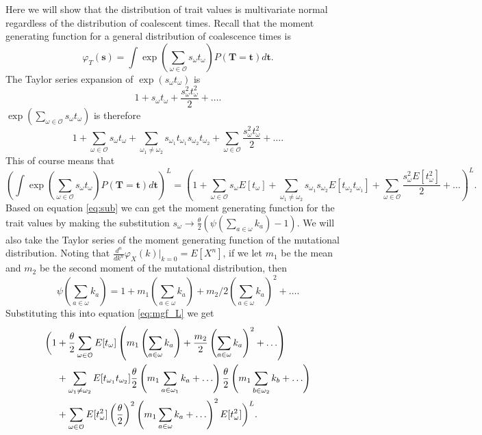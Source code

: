 Here we will show that the distribution of trait values is multivariate normal
regardless of the distribution of coalescent times. Recall that the moment
generating function for a general distribution of coalescence times is
\begin{equation}
  \varphi_T(\mathbf{s}) = \int \exp \left( \sum_{\omega \in \mathcal{O}} s_{\omega}t_{\omega} \right)
  P(\mathbf{T}=\mathbf{t})d\mathbf{t}.
\end{equation}
The Taylor series expansion of $\exp \left( s_{\omega}t_{\omega} \right)$ is
\begin{equation}
  1 + s_{\omega}t_{\omega} + \frac{s_{\omega}^2t_{\omega}^2}{2} + \ldots. \nonumber
\end{equation}
$\exp \left( \sum_{\omega \in \mathcal{O}} s_{\omega}t_{\omega} \right)$ is therefore
\begin{equation}
  1 + \sum_{\omega \in \mathcal{O}} s_{\omega}t_{\omega} +
  \sum_{\omega_1 \neq \omega_2} s_{\omega_1}t_{\omega_1}s_{\omega_2}t_{\omega_2} + 
  \sum_{\omega \in \mathcal{O}} \frac{s_{\omega}^2t_{\omega}^2}{2} + \ldots. \nonumber
\end{equation}
This of course means that
\begin{equation}
  \label{eq:mgf_L}
  \left(\int \exp \left( \sum_{\omega \in \mathcal{O}} s_{\omega}t_{\omega}
  \right)P(\mathbf{T}=\mathbf{t})d\mathbf{t}\right)^L = \left(1 + \sum_{\omega \in \mathcal{O}}
  s_{\omega}E[t_{\omega}] + \sum_{\omega_1 \neq \omega_2}
  s_{\omega_1}s_{\omega_2}E[t_{\omega_2}t_{\omega_1}] + \sum_{\omega \in
    \mathcal{O}} \frac{s_{\omega}^2E[t_{\omega}^2]}{2} + \ldots\right)^L. 
\end{equation}
Based on equation \ref{eq:sub} we can get the moment generating function for the
trait values by making the substitution $s_{\omega}\to \frac{\theta}{2} \left(
\psi\left(\sum_{a \in \omega}k_{a}\right) -1 \right)$. We will also take the
Taylor series of the moment generating function of the mutational distribution.
Noting that $\frac{d^n}{dk^n}\varphi_X(k)\Bigr|_{k=0} = E[X^n]$, if we let $m_1$
be the mean and $m_2$ be the second moment of the mutational distribution, then
\begin{equation}
  \psi\left( \sum_{a \in \omega} k_a \right) = 1 + m_1 \left( \sum_{a \in \omega}
  k_a\right) + m_2/2\left( \sum_{a \in \omega} k_a\right)^2 + \ldots.
  \nonumber
\end{equation}
Substituting this into equation \ref{eq:mgf_L} we get
\begin{align}
  \biggl( 1 &+ \frac{\theta}{2} \sum_{\omega \in \mathcal{O}} E[t_{\omega}]\left( m_1 \left(
  \sum_{a \in \omega} k_a \right) + \frac{m_2}{2} \left( \sum_{a \in \omega}
  k_a\right)^2 + \ldots \right) \\
  &+ \sum_{\omega_1 \neq \omega_2} E[t_{\omega_1}t_{\omega_2}]\frac{\theta}{2}\left( m_1 \sum_{a \in \omega_1} k_a + \ldots \right)
  \frac{\theta}{2} \left( m_1 \sum_{b \in \omega_2} k_b + \ldots \right) \\
  &+ \sum_{\omega \in \mathcal{O}} E[t^2_{\omega}] \left(\frac{\theta}{2}\right)^2\left(m_1 \sum_{a \in \omega} k_a +
  \ldots \right)^2 E[t^2_{\omega}] \biggr)^L.
\end{align}

